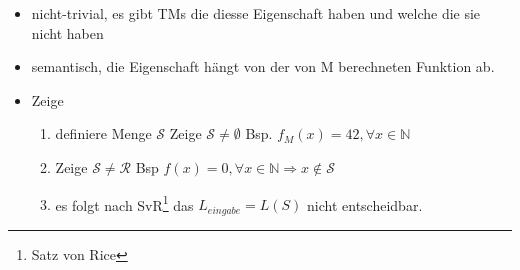 \documentclass[a4paper, 10pt]{article}
\theoremstyle{definition}
\begin{document}
\begin{itemize}
\begin{itemize}
        \item nicht-trivial, es gibt TMs die diesse Eigenschaft haben und welche die sie nicht haben
        \item semantisch, die Eigenschaft hängt von der von M berechneten Funktion ab.
        \item Zeige \begin{enumerate}
            \item definiere Menge $\mathcal{S}$
            \itme Zeige $\mathcal{S}\neq\emptyset$ Bsp. $f_M(x)=42,\forall x\in\mathbb{N}$
            \item Zeige $\mathcal{S}\neq\mathcal{R}$ Bsp $f(x)=0,\forall x\in\mathbb{N}\Rightarrow x\not\in\mathcal{S}$
            \item es folgt nach SvR\footnote{Satz von Rice} das $L_{eingabe}=L(S)$ nicht entscheidbar.
        \end{enumerate}
    \end{itemize}
\end{itemize}
\end{document}
